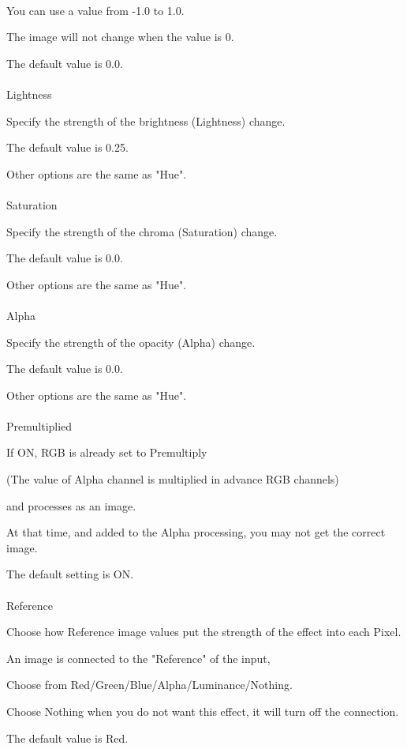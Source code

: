 \documentclass[a4paper,12pt]{article}
\begin{document}
\ \vspace{-0.2em}
\par
You can use a value from -1.0 to 1.0.\par
The image will not change when the value is 0.\par
The default value is 0.0.\\
\\
Lightness\par
Specify the strength of the brightness (Lightness) change.\par
The default value is 0.25.\par
Other options are the same as "Hue".\\
\\
Saturation\par
Specify the strength of the chroma (Saturation) change.\par
The default value is 0.0.\par
Other options are the same as "Hue".\\
\\
Alpha\par
Specify the strength of the opacity (Alpha) change.\par
The default value is 0.0.\par
Other options are the same as "Hue".\\
\\
Premultiplied\par
If ON, RGB is already set to Premultiply\par
(The value of Alpha channel is multiplied in advance RGB channels)\par
and processes as an image.\par
At that time, and added to the Alpha processing, you may not get the correct image.\par
The default setting is ON.\\
\\
Reference\par
Choose how Reference image values put the strength of the effect into each Pixel.\par
An image is connected to the "Reference" of the input,\par
Choose from Red/Green/Blue/Alpha/Luminance/Nothing.\par
Choose Nothing when you do not want this effect, it will turn off the connection.\par
The default value is Red.
\end{document}
